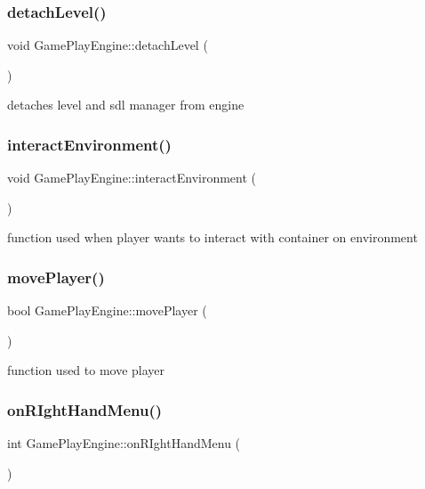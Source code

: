 \subsubsection{\texorpdfstring{detach\+Level()}{detachLevel()}}
{\footnotesize\ttfamily void Game\+Play\+Engine\+::detach\+Level (\begin{DoxyParamCaption}{ }\end{DoxyParamCaption})}

detaches level and sdl manager from engine \hypertarget{class_game_play_engine_a2a0f5663a43825bbd815d6bfe92bd8fb}{}\label{class_game_play_engine_a2a0f5663a43825bbd815d6bfe92bd8fb} 
\subsubsection{\texorpdfstring{interact\+Environment()}{interactEnvironment()}}
{\footnotesize\ttfamily void Game\+Play\+Engine\+::interact\+Environment (\begin{DoxyParamCaption}{ }\end{DoxyParamCaption})}

function used when player wants to interact with container on environment \hypertarget{class_game_play_engine_a8f046d598bc155f3c6e6f534b7fdab5e}{}\label{class_game_play_engine_a8f046d598bc155f3c6e6f534b7fdab5e} 
\subsubsection{\texorpdfstring{move\+Player()}{movePlayer()}}
{\footnotesize\ttfamily bool Game\+Play\+Engine\+::move\+Player (\begin{DoxyParamCaption}{ }\end{DoxyParamCaption})}

function used to move player \hypertarget{class_game_play_engine_a85db5a21ac09903aa84fc35378b273ea}{}\label{class_game_play_engine_a85db5a21ac09903aa84fc35378b273ea} 
\subsubsection{\texorpdfstring{on\+R\+Ight\+Hand\+Menu()}{onRIghtHandMenu()}}
{\footnotesize\ttfamily int Game\+Play\+Engine\+::on\+R\+Ight\+Hand\+Menu (\begin{DoxyParamCaption}{ }\end{DoxyParamCaption})}


